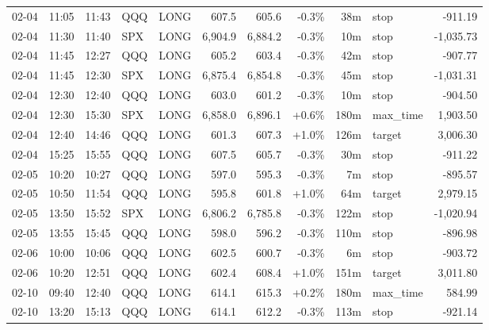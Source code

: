 \documentclass[11pt,a4paper,twoside]{article}
\begin{document}
\begin{center}
\begin{longtable}{>{\color{txtmain}}l l l l l r r r r >{\color{txtmain}}l r}
02-04 & 11:05 & 11:43 & QQQ & LONG & 607.5 & 605.6 & \textcolor{lossred}{-0.3\%} & 38m & stop & \textcolor{lossred}{-911.19} \\
02-04 & 11:30 & 11:40 & SPX & LONG & 6,904.9 & 6,884.2 & \textcolor{lossred}{-0.3\%} & 10m & stop & \textcolor{lossred}{-1,035.73} \\
02-04 & 11:45 & 12:27 & QQQ & LONG & 605.2 & 603.4 & \textcolor{lossred}{-0.3\%} & 42m & stop & \textcolor{lossred}{-907.77} \\
02-04 & 11:45 & 12:30 & SPX & LONG & 6,875.4 & 6,854.8 & \textcolor{lossred}{-0.3\%} & 45m & stop & \textcolor{lossred}{-1,031.31} \\
02-04 & 12:30 & 12:40 & QQQ & LONG & 603.0 & 601.2 & \textcolor{lossred}{-0.3\%} & 10m & stop & \textcolor{lossred}{-904.50} \\
02-04 & 12:30 & 15:30 & SPX & LONG & 6,858.0 & 6,896.1 & \textcolor{wingreen}{+0.6\%} & 180m & max\_time & \textcolor{wingreen}{1,903.50} \\
02-04 & 12:40 & 14:46 & QQQ & LONG & 601.3 & 607.3 & \textcolor{wingreen}{+1.0\%} & 126m & target & \textcolor{wingreen}{3,006.30} \\
02-04 & 15:25 & 15:55 & QQQ & LONG & 607.5 & 605.7 & \textcolor{lossred}{-0.3\%} & 30m & stop & \textcolor{lossred}{-911.22} \\
02-05 & 10:20 & 10:27 & QQQ & LONG & 597.0 & 595.3 & \textcolor{lossred}{-0.3\%} & 7m & stop & \textcolor{lossred}{-895.57} \\
02-05 & 10:50 & 11:54 & QQQ & LONG & 595.8 & 601.8 & \textcolor{wingreen}{+1.0\%} & 64m & target & \textcolor{wingreen}{2,979.15} \\
02-05 & 13:50 & 15:52 & SPX & LONG & 6,806.2 & 6,785.8 & \textcolor{lossred}{-0.3\%} & 122m & stop & \textcolor{lossred}{-1,020.94} \\
02-05 & 13:55 & 15:45 & QQQ & LONG & 598.0 & 596.2 & \textcolor{lossred}{-0.3\%} & 110m & stop & \textcolor{lossred}{-896.98} \\
02-06 & 10:00 & 10:06 & QQQ & LONG & 602.5 & 600.7 & \textcolor{lossred}{-0.3\%} & 6m & stop & \textcolor{lossred}{-903.72} \\
02-06 & 10:20 & 12:51 & QQQ & LONG & 602.4 & 608.4 & \textcolor{wingreen}{+1.0\%} & 151m & target & \textcolor{wingreen}{3,011.80} \\
02-10 & 09:40 & 12:40 & QQQ & LONG & 614.1 & 615.3 & \textcolor{wingreen}{+0.2\%} & 180m & max\_time & \textcolor{wingreen}{584.99} \\
02-10 & 13:20 & 15:13 & QQQ & LONG & 614.1 & 612.2 & \textcolor{lossred}{-0.3\%} & 113m & stop & \textcolor{lossred}{-921.14} \\

\end{longtable}
\end{center}
\end{document}
